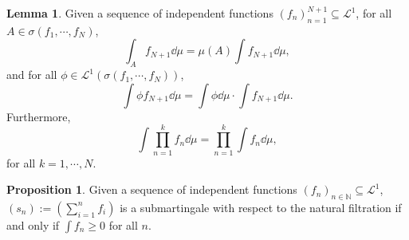 \documentclass[]{article}
\theoremstyle{definition}
\theoremstyle{definition}
\newtheorem{lemma}{Lemma}[section]
\newtheorem{proposition}{Proposition}[section]
\begin{document}
\begin{lemma}
  Given a sequence of independent functions \((f_n)_{n = 1}^{N + 1} 
  \subseteq \mathcal{L}^1\), for all \(A \in \sigma(f_1, \cdots, f_N)\),
  \[\int_A f_{N+ 1} \dd \mu = \mu(A) \int f_{N + 1} \dd \mu,\]
  and for all \(\phi \in \mathcal{L}^1(\sigma(f_1, \cdots, f_N))\),  
  \[\int \phi f_{N + 1} \dd\mu = \int \phi \dd\mu \cdot\int f_{N + 1}\dd\mu.\]
  Furthermore, 
  \[\int \prod_{n = 1}^k f_n \dd \mu = \prod_{n = 1}^k \int f_n \dd \mu,\]
  for all \(k = 1, \cdots, N\).
\end{lemma}

\begin{proposition}
  Given a sequence of independent functions \((f_n)_{n \in \mathbb{N}} 
  \subseteq \mathcal{L}^1\), \((s_n) := \left(\sum_{i = 1}^n f_i\right)\) is 
  a submartingale with respect to the natural filtration if and only if 
  \(\int f_n \ge 0\) for all \(n\).
\end{proposition}
\end{document}
